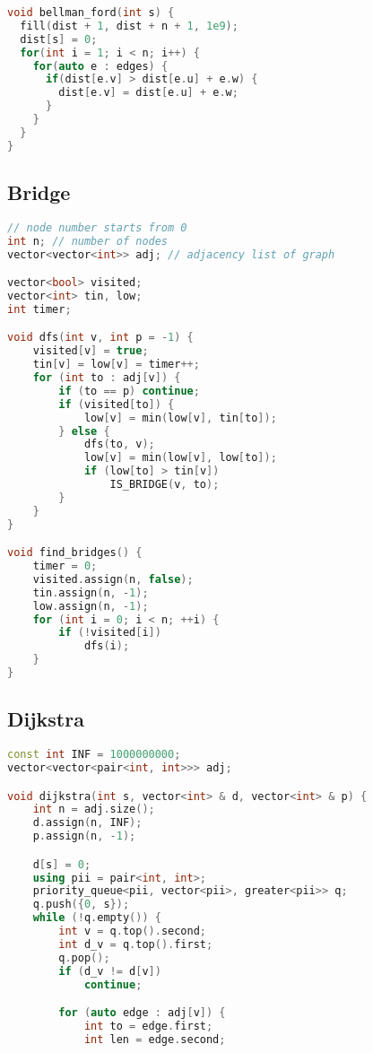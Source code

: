 \documentclass[10pt,a4paper,landscape]{article}
\begin{document}
\begin{multicols}{3}
\begin{lstlisting}[language=C++, breaklines=true]
void bellman_ford(int s) {
  fill(dist + 1, dist + n + 1, 1e9);
  dist[s] = 0;
  for(int i = 1; i < n; i++) {
    for(auto e : edges) {
      if(dist[e.v] > dist[e.u] + e.w) {
        dist[e.v] = dist[e.u] + e.w;
      }
    }
  }
}
\end{lstlisting}

\subsection{Bridge}
\begin{lstlisting}[language=C++, breaklines=true]
// node number starts from 0
int n; // number of nodes
vector<vector<int>> adj; // adjacency list of graph

vector<bool> visited;
vector<int> tin, low;
int timer;

void dfs(int v, int p = -1) {
    visited[v] = true;
    tin[v] = low[v] = timer++;
    for (int to : adj[v]) {
        if (to == p) continue;
        if (visited[to]) {
            low[v] = min(low[v], tin[to]);
        } else {
            dfs(to, v);
            low[v] = min(low[v], low[to]);
            if (low[to] > tin[v])
                IS_BRIDGE(v, to);
        }
    }
}

void find_bridges() {
    timer = 0;
    visited.assign(n, false);
    tin.assign(n, -1);
    low.assign(n, -1);
    for (int i = 0; i < n; ++i) {
        if (!visited[i])
            dfs(i);
    }
}

\end{lstlisting}

\subsection{Dijkstra}
\begin{lstlisting}[language=C++, breaklines=true]
const int INF = 1000000000;
vector<vector<pair<int, int>>> adj;

void dijkstra(int s, vector<int> & d, vector<int> & p) {
    int n = adj.size();
    d.assign(n, INF);
    p.assign(n, -1);

    d[s] = 0;
    using pii = pair<int, int>;
    priority_queue<pii, vector<pii>, greater<pii>> q;
    q.push({0, s});
    while (!q.empty()) {
        int v = q.top().second;
        int d_v = q.top().first;
        q.pop();
        if (d_v != d[v])
            continue;

        for (auto edge : adj[v]) {
            int to = edge.first;
            int len = edge.second;


\end{lstlisting}
\end{multicols}
\end{document}
